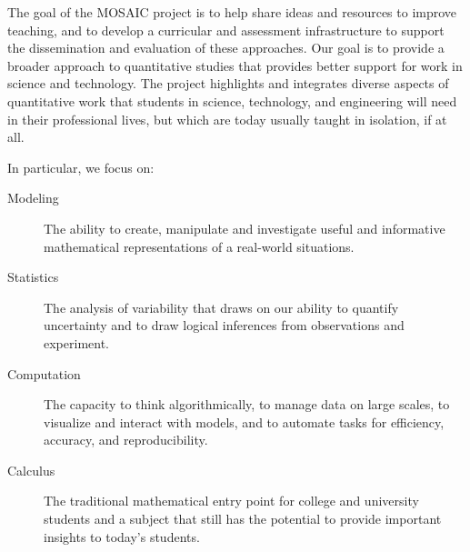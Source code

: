\documentclass{tufte-book}\usepackage[]{graphicx}\usepackage[]{xcolor}
\begin{document}
\bigskip

The goal of the MOSAIC project is to help share ideas and resources to
improve teaching, and to develop a curricular and assessment
infrastructure to support the dissemination and evaluation of these approaches.
Our goal is to provide a broader approach to quantitative studies that provides
better support for work in science and technology. 
The project highlights and integrates
diverse aspects of quantitative work that students in science,
technology, and engineering will need in their professional lives, but which
are today usually taught in isolation, if at all.  

\vspace{.1in}

In particular, we focus on:
\begin{description}
	\item[Modeling] The ability to create, manipulate and investigate useful	and informative mathematical representations of a real-world situations.

	\item[Statistics] The analysis of variability that draws on our ability to	quantify uncertainty and to draw logical inferences from observations and experiment.

    \item[Computation] 
	The capacity to think algorithmically, to manage data on large scales, to	visualize and interact with models, and to automate tasks for efficiency, accuracy, and reproducibility.

    \item[Calculus] 
	The traditional mathematical entry point for college and university students and a subject that still has the potential to provide important insights to today's students.
	\end{description}
\end{document}
